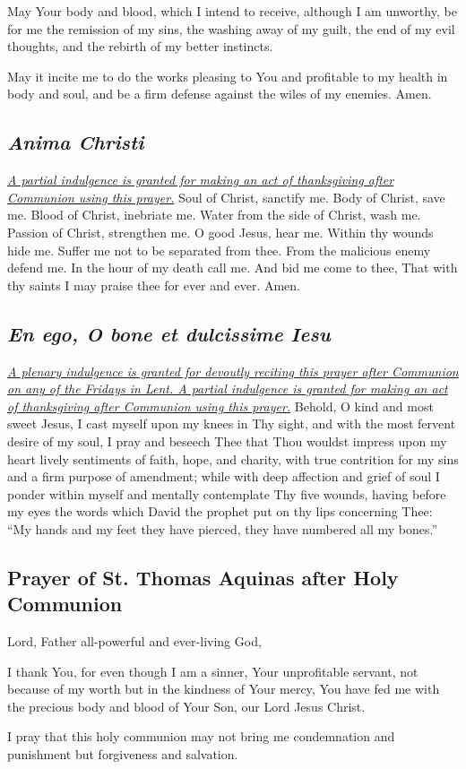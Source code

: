 \documentclass[12pt]{article}
\newcommand{\prayertitle}[1]{\subsection{#1}}
\newcommand{\indulgencedprayertitle}[1]{\prayertitle{#1 \protect\kreuz}}
\newcommand{\foreign}[1]{\textsl{#1}}
\newcommand{\note}[1]{{\small{\textsl{#1}}}\newline}
\newcommand{\linkednote}[2]{\hyperlink{#1}{\note{#2}}}
\begin{document}
May Your body and blood, which I intend to receive, although I am unworthy, be for me the remission of my sins, the washing away of my guilt, the end of my evil thoughts, and the rebirth of my better instincts.

May it incite me to do the works pleasing to You and profitable to my health in body and soul, and be a firm defense against the wiles of my enemies.
Amen.

\indulgencedprayertitle{\foreign{Anima Christi}}
\linkednote{grant8}{A partial indulgence is granted for making an act of thanksgiving after Communion using this prayer.}
Soul of Christ, sanctify me.
Body of Christ, save me.
Blood of Christ, inebriate me.
Water from the side of Christ, wash me.
Passion of Christ, strengthen me.
O good Jesus, hear me.
Within thy wounds hide me.
Suffer me not to be separated from thee.
From the malicious enemy defend me.
In the hour of my death call me.
And bid me come to thee,
That with thy saints I may praise thee for ever and ever.
Amen.

\indulgencedprayertitle{\foreign{En ego, O bone et dulcissime Iesu}}
\linkednote{grant8}{A plenary indulgence is granted for devoutly reciting this prayer after Communion on any of the Fridays in Lent. A partial indulgence is granted for making an act of thanksgiving after Communion using this prayer.}
Behold, O kind and most sweet Jesus, I cast myself upon my knees in Thy sight, and with the most fervent desire of my soul, I pray and beseech Thee that Thou wouldst impress upon my heart lively sentiments of faith, hope, and charity, with true contrition for my sins and a firm purpose of amendment;
while with deep affection and grief of soul I ponder within myself and mentally contemplate Thy five wounds, having before my eyes the words which David the prophet put on thy lips concerning Thee:
``My hands and my feet they have pierced, they have numbered all my bones.''

\prayertitle{Prayer of St. Thomas Aquinas after Holy Communion}
Lord, Father all-powerful and ever-living God,

I thank You, for even though I am a sinner, Your unprofitable servant, not because of my worth but in the kindness of Your mercy, You have fed me with the precious body and blood of Your Son, our Lord Jesus Christ.

I pray that this holy communion may not bring me condemnation and punishment but forgiveness and salvation.
\end{document}

